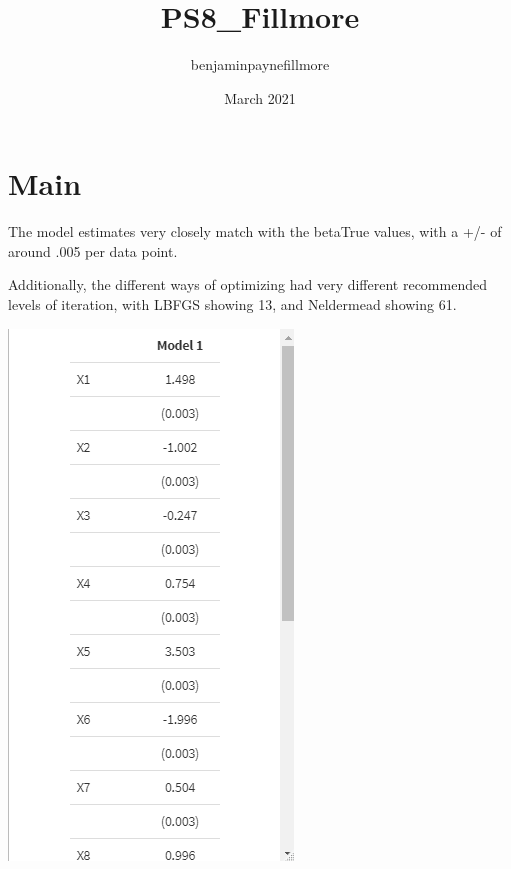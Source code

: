 \documentclass{article}
\title{PS8_Fillmore}
\author{benjaminpaynefillmore }
\date{March 2021}
\begin{document}
\graphicspath{ {./images/} }
\maketitle

\section{Main}

The model estimates very closely match with the betaTrue values, with a +/- of around .005 per data point. 

Additionally, the different ways of optimizing had very different recommended levels of iteration, with LBFGS showing 13, and Neldermead showing 61.

\includegraphics[width=\textwidth]{Images/PS8_Fillmore.png}
\end{document}
